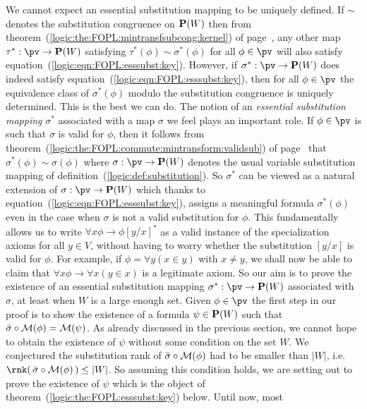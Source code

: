 We cannot expect an essential substitution mapping to be uniquely
defined. If $\sim$ denotes the substitution congruence on ${\bf
P}(W)$ then from
theorem~(\ref{logic:the:FOPL:mintransfsubcong:kernel}) of
page~\pageref{logic:the:FOPL:mintransfsubcong:kernel}, any other map
$\tau^{*}:\pv\to{\bf P}(W)$ satisfying
$\tau^{*}(\phi)\sim\sigma^{*}(\phi)$ for all $\phi\in\pv$ will also
satisfy equation~(\ref{logic:eqn:FOPL:esssubst:key}). However, if
$\sigma^{*}:\pv\to{\bf P}(W)$ does indeed satisfy
equation~(\ref{logic:eqn:FOPL:esssubst:key}), then for all
$\phi\in\pv$ the equivalence class of $\sigma^{*}(\phi)$ modulo the
substitution congruence is uniquely determined. This is the best we
can do. The notion of an {\em essential substitution mapping}
$\sigma^{*}$ associated with a map $\sigma$ we feel plays an
important role. If $\phi\in\pv$ is such that $\sigma$ is valid for
$\phi$, then it follows from
theorem~(\ref{logic:the:FOPL:commute:mintransform:validsub}) of
page~\pageref{logic:the:FOPL:commute:mintransform:validsub} that
$\sigma^{*}(\phi)\sim\sigma(\phi)$ where $\sigma:\pv\to{\bf P}(W)$
denotes the usual variable substitution mapping of
definition~(\ref{logic:def:substitution}). So $\sigma^{*}$ can be
viewed as a natural extension of $\sigma:\pv\to{\bf P}(W)$ which
thanks to equation~(\ref{logic:eqn:FOPL:esssubst:key}), assigns a
meaningful formula $\sigma^{*}(\phi)$ even in the case when $\sigma$
is not a valid substitution for $\phi$. This fundamentally allows us
to write $\forall x\phi\to\phi[y/x]^{*}$ as a valid instance of the
specialization axioms for all $y\in V$, without having to worry
whether the substitution $[y/x]$ is valid for $\phi$. For example,
if $\phi=\forall y(x\in y)$ with $x\neq y$, we shall now be able to
claim that $\forall x\phi\to\forall x(y\in x)$ is a legitimate
axiom. So our aim is to prove the existence of an essential
substitution mapping $\sigma^{*}:\pv\to{\bf P}(W)$ associated with
$\sigma$, at least when $W$ is a large enough set. Given
$\phi\in\pv$ the first step in our proof is to show the existence of
a formula $\psi\in{\bf P}(W)$ such that $\bar{\sigma}\circ{\cal
M}(\phi)={\cal M}(\psi)$. As already discussed in the previous
section, we cannot hope to obtain the existence of $\psi$ without
some condition on the set $W$. We conjectured the substitution rank
of $\bar{\sigma}\circ{\cal M}(\phi)$ had to be smaller than $|W|$,
i.e. $\rnk(\,\bar{\sigma}\circ{\cal M}(\phi)\,)\leq|W|$. So assuming
this condition holds, we are setting out to prove the existence of
$\psi$ which is the object of
theorem~(\ref{logic:the:FOPL:esssubst:key}) below. Until now, most
